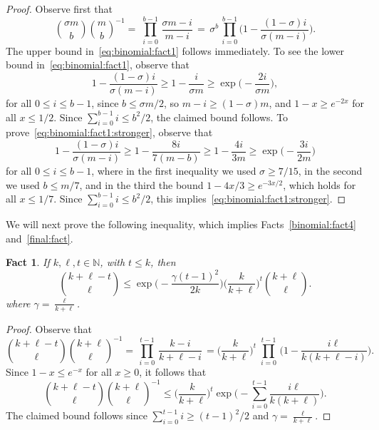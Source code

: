 \documentclass[12pt,reqno]{amsart}
\newtheorem{fact}[theorem]{Fact}
\theoremstyle{definition}
\theoremstyle{remark}
\newcommand\N{\mathbb{N}}
\renewcommand{\le}{\leqslant}
\renewcommand{\ge}{\geqslant}
\def\N{\mathbb{N}}
\begin{document}
\begin{proof}
Observe first that
$${\sigma m \choose b} {m \choose b}^{-1} = \; \prod_{i = 0}^{b-1} \, \frac{\sigma m - i}{m - i} \, = \, \sigma^b \, \prod_{i = 0}^{b-1} \bigg( 1 - \frac{(1 - \sigma)i}{\sigma(m - i)} \bigg).$$
The upper bound in~\eqref{eq:binomial:fact1} follows immediately. To see the lower bound in~\eqref{eq:binomial:fact1}, observe that 
$$1 - \frac{(1 - \sigma)i}{\sigma(m - i)} \ge 1 - \frac{i}{\sigma m} \ge \exp\bigg( - \frac{2i}{\sigma m} \bigg),$$
for all $0 \le i \le b - 1$, since $b \le \sigma m / 2$, so $m - i \ge (1 - \sigma)m$, and %
$1 - x \ge e^{-2x}$ for all $x \le 1/2$. Since $\sum_{i = 0}^{b-1} i \le b^2/2$, the claimed bound follows. To prove~\eqref{eq:binomial:fact1:stronger}, observe that
$$1 - \frac{(1 - \sigma)i}{\sigma(m - i)} \ge 1 - \frac{8i}{7(m-b)}  \ge 1 - \frac{4i}{3m} \ge \exp\bigg( - \frac{3i}{2m} \bigg)$$
for all $0 \le i \le b - 1$, where in the first inequality we used $\sigma \ge 7/15$, in the second we used $b \le m/7$, and in the third the bound $1 - 4x/3 \ge e^{-3x/2}$, which holds for all $x \le 1/7$. Since $\sum_{i = 0}^{b-1} i \le b^2/2$, this implies~\eqref{eq:binomial:fact1:stronger}.
\end{proof}

We will next prove the following inequality, which implies Facts~\ref{binomial:fact4} and~\ref{final:fact}.
 
\begin{fact}\label{fact:app:D}
If $k,\ell,t \in \N$, with $t \le k$, then
$${k + \ell - t  \choose \ell} \le \exp\bigg( - \frac{\gamma (t-1)^2}{2k} \bigg) \bigg( \frac{k}{k + \ell} \bigg)^t {k + \ell \choose \ell}.$$
where $\gamma = \frac{\ell}{k+\ell}$.  
\end{fact}

\begin{proof}
Observe that 
$${k+\ell - t \choose \ell} {k+\ell \choose \ell}^{-1} = \, \prod_{i = 0}^{t-1} \, \frac{k - i}{k + \ell - i} \, = \bigg( \frac{k}{k + \ell} \bigg)^t \; \prod_{i = 0}^{t-1} \,\bigg( 1 - \frac{i\ell}{k(k+\ell - i)} \bigg).$$
Since $1 - x \le e^{- x}$ for all $x \ge 0$, it follows that
$${k+\ell - t \choose \ell} {k+\ell \choose \ell}^{-1} \le \bigg( \frac{k}{k + \ell} \bigg)^t \exp\bigg( - \sum_{i = 0}^{t-1} \frac{i\ell}{k(k+\ell)} \bigg).$$
The claimed bound follows since $\sum_{i = 0}^{t-1} i \ge (t-1)^2/2$ and $\gamma = \frac{\ell}{k+\ell}$.
\end{proof}
\end{document}
